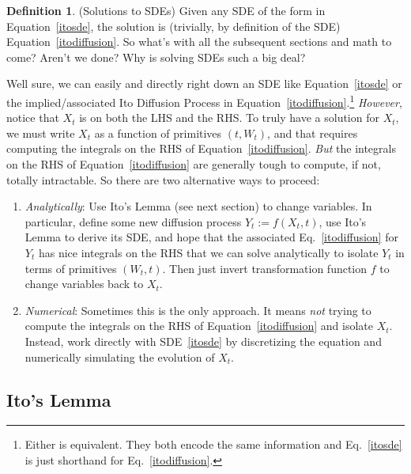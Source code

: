\documentclass[12pt]{article}
\theoremstyle{plain}
\theoremstyle{definition}
\newtheorem{defn}[thm]{Definition}
\theoremstyle{remark}
\begin{document}
\begin{defn}(Solutions to SDEs)
Given any SDE of the form in Equation~\ref{itosde}, the solution is
(trivially, by definition of the SDE) Equation~\ref{itodiffusion}.
So what's with all the subsequent sections and math to come? Aren't we
done? Why is solving SDEs such a big deal?

Well sure, we can easily and directly right down an SDE like
Equation~\ref{itosde} or the implied/associated Ito Diffusion Process in
Equation~\ref{itodiffusion}.\footnote{%
  Either is equivalent. They both encode the same information and
  Eq.~\ref{itosde} is just shorthand for
  Eq.~\ref{itodiffusion}.
}
\emph{However}, notice that $X_t$ is on both the LHS and the RHS.  To
truly have a solution for $X_t$, we must write $X_t$ as a function of
primitives $(t,W_t)$, and that requires computing the integrals on the
RHS of Equation~\ref{itodiffusion}.
\emph{But} the integrals on the RHS of Equation~\ref{itodiffusion} are
generally tough to compute, if not, totally intractable.
So there are two alternative ways to proceed:
\begin{enumerate}
  \item \emph{Analytically}:
    Use Ito's Lemma (see next section) to change variables.
    In particular, define some new diffusion process $Y_t:=f(X_t,t)$,
    use Ito's Lemma to derive its SDE, and hope that the associated
    Eq.~\ref{itodiffusion} for $Y_t$ has nice integrals on the RHS
    that we can solve analytically to isolate $Y_t$ in terms of
    primitives $(W_t,t)$. Then just invert transformation function $f$
    to change variables back to $X_t$.
  \item \emph{Numerical}:
    Sometimes this is the only approach.
    It means \emph{not} trying to compute the integrals on the RHS of
    Equation~\ref{itodiffusion} and isolate $X_t$.
    Instead, work directly with SDE~\ref{itosde} by discretizing the
    equation and numerically simulating the evolution of $X_t$.
\end{enumerate}
\end{defn}


\clearpage
\subsection{Ito's Lemma}
\end{document}
